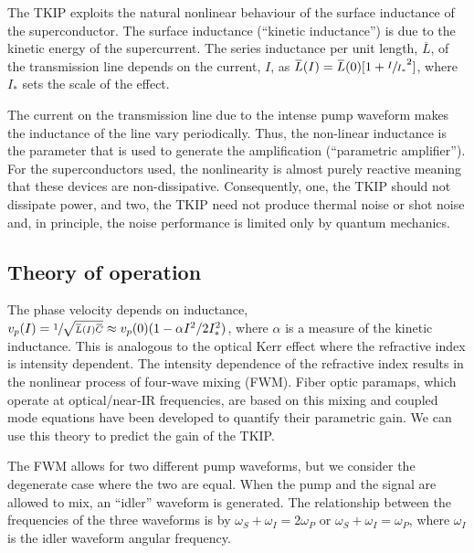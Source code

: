 The TKIP exploits the natural nonlinear behaviour of the surface inductance of the superconductor.  The surface inductance (``kinetic inductance'') is due to the kinetic energy of the supercurrent. The series inductance per unit length, $\overbar{L}$, of the transmission line depends on the current, $I$, as $\overbar{L}(I) = \overbar{L}(0)[1+ \sfrac{I}{I_*}^2]$, where $I_*$ sets the scale of the effect. 

The current on the transmission line due to the intense pump waveform makes the inductance of the line vary periodically. Thus, the non-linear inductance is the parameter that is used to generate the amplification (``parametric amplifier'').  For the superconductors used, the nonlinearity is almost purely reactive meaning that these devices are non-dissipative. Consequently, one, the TKIP should not dissipate power, and two, the TKIP need not produce thermal noise or shot noise and, in principle, the noise performance is limited only by quantum mechanics.


\subsection*{Theory of operation}
The phase velocity depends on inductance, $v_{p}(I)= \sfrac{1}{\sqrt{\overbar{L}(I)\overbar{C}}} \approx v_{p}(0)(1 - \alpha I^2 / 2 I^2_*)$, where $\alpha$ is a measure of the kinetic inductance. This is analogous to the optical Kerr effect where the refractive index is intensity dependent. The intensity dependence of the refractive index results in the nonlinear process of four-wave mixing (FWM). Fiber optic paramaps, which operate at optical/near-IR frequencies, are based on this mixing \cite{Hansryd2002} and coupled mode equations have been developed to quantify their parametric gain. We can use this theory \cite{Stolen1982} to predict the gain of the TKIP. 

 
The FWM allows for two different  pump waveforms, but we consider the degenerate case where the two are equal. When the pump and the signal are allowed to mix, an ``idler''  waveform is  generated. The relationship between the frequencies of the three waveforms is by $\omega_S+\omega_I = 2\omega_P$ or $\omega_S+\omega_I = \omega_P$, where $\omega_I$ is the idler waveform angular frequency.


